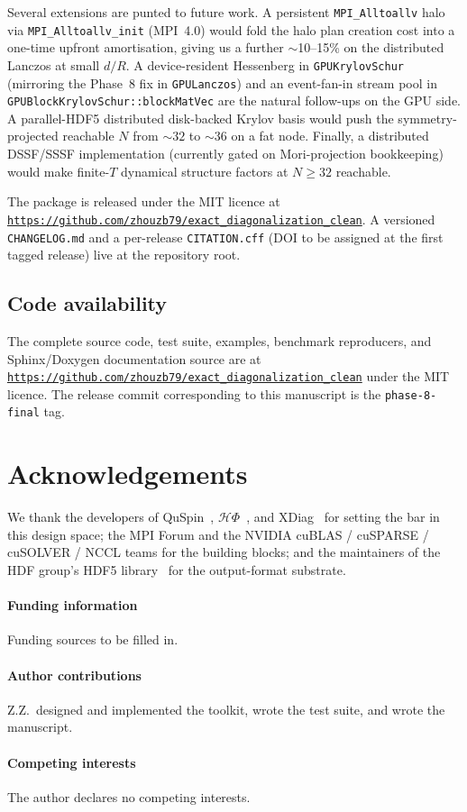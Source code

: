 \documentclass[submission, PhysCodeb]{SciPost}
\begin{document}
Several extensions are punted to future work. A persistent
\texttt{MPI\_Alltoallv} halo via \texttt{MPI\_Alltoallv\_init}
(MPI~4.0) would fold the halo plan creation cost into a one-time
upfront amortisation, giving us a further $\sim$10--15\% on the
distributed Lanczos at small $d/R$. A device-resident Hessenberg in
\texttt{GPUKrylovSchur} (mirroring the Phase~8 fix in
\texttt{GPULanczos}) and an event-fan-in stream pool in
\texttt{GPUBlockKrylovSchur::blockMatVec} are the natural follow-ups
on the GPU side. A parallel-HDF5 distributed disk-backed Krylov
basis would push the symmetry-projected reachable $N$ from $\sim 32$
to $\sim 36$ on a fat node. Finally, a distributed DSSF/SSSF
implementation (currently gated on Mori-projection bookkeeping) would
make finite-$T$ dynamical structure factors at $N \geq 32$
reachable.

The package is released under the MIT licence at
\href{https://github.com/zhouzb79/exact_diagonalization_clean}%
{\nolinkurl{https://github.com/zhouzb79/exact_diagonalization_clean}}.
A versioned \texttt{CHANGELOG.md} and a per-release
\texttt{CITATION.cff} (DOI to be assigned at the first tagged
release) live at the repository root.

\subsection*{Code availability}

The complete source code, test suite, examples, benchmark
reproducers, and Sphinx/Doxygen documentation source are at
\href{https://github.com/zhouzb79/exact_diagonalization_clean}%
{\nolinkurl{https://github.com/zhouzb79/exact_diagonalization_clean}}
under the MIT licence. The release commit corresponding to this
manuscript is the \texttt{phase-8-final} tag.

\section*{Acknowledgements}

We thank the developers of QuSpin~\cite{Weinberg2017QuSpin,
Weinberg2019QuSpin2}, $\mathcal{H}\Phi$~\cite{Wietek2018HPhi}, and
XDiag~\cite{Wietek2025XDiag} for setting the bar in this design
space; the MPI Forum and the NVIDIA cuBLAS / cuSPARSE / cuSOLVER /
NCCL teams for the building blocks; and the maintainers of the HDF
group's HDF5 library~\cite{Folk2011HDF5,HDF5website} for the
output-format substrate.

\paragraph{Funding information}
Funding sources to be filled in.

\paragraph{Author contributions}
Z.Z.\ designed and implemented the toolkit, wrote the test suite, and
wrote the manuscript.

\paragraph{Competing interests}
The author declares no competing interests.


\end{document}
